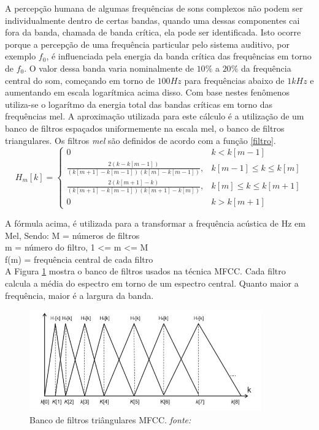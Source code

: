 A percepção humana de algumas frequências de sons complexos não podem ser individualmente dentro de certas bandas, quando uma dessas componentes cai fora da banda, chamada de banda crítica, ela pode ser identificada. Isto ocorre porque a percepção de uma frequência particular pelo sistema auditivo, por exemplo $f_0$, é influenciada pela energia da banda crítica das frequências em torno de $f_0$. O valor dessa banda varia nominalmente de $10 \%$ a $20 \%$ da frequência central do som, começando em torno de $100 Hz$ para frequências abaixo de $1 kHz$ e aumentando em escala logarítmica acima disso. Com base nestes fenômenos utiliza-se o logarítmo da energia total das bandas críticas em torno das frequências mel. A aproximação utilizada para este cálculo é a utilização de um banco de filtros espaçados uniformemente na escala mel, o banco de filtros triangulares. Os filtros \textit{mel} são definidos de acordo com a função \ref{filtro}.
\begin{equation}
\label{filtro}
H_m[k] = \left\{\begin{array}{ll}
0 & k < k[m-1]\\
\displaystyle \frac{2(k-k[m-1])}{(k[m+1]-k[m-1])(k[m]-k[m-1])}, & k[m-1] \leq k \leq k[m] \\
\displaystyle \frac{2(k[m+1]-k)}{(k[m+1]-k[m-1])(k[m+1]-k[m])}, & k[m] \leq k \leq k[m+1] \\
0 & k > k[m+1]\end{array} \right.
\end{equation}

A fórmula acima, é utilizada para a transformar a frequência acústica de Hz em Mel, Sendo:
M = números de filtros\\
m = número do filtro, 1 <= m <= M\\
f(m) = frequência central de cada filtro\\

A Figura \ref{fig:filtro} mostra o banco de filtros usados na técnica MFCC. Cada filtro calcula a média do espectro em torno de um espectro central. Quanto maior a frequência, maior é a largura da banda.

\begin{figure}[H]
\centering %
\includegraphics[width=10cm]{img/filtrotriangular.jpg} %
\caption{Banco de filtros triângulares MFCC. \textit{fonte: \cite{pucpncc}}}
\label{fig:filtro}
\end{figure}

